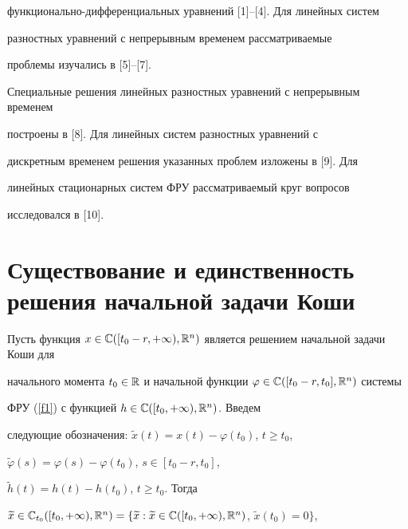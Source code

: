 функционально-дифференциальных уравнений [1]--[4]. Для линейных систем


разностных уравнений с непрерывным временем рассматриваемые


проблемы изучались в [5]--[7].


Специальные решения линейных разностных уравнений с непрерывным временем 


построены в [8]. Для линейных систем разностных уравнений с 


дискретным временем решения указанных проблем изложены в [9]. Для


линейных стационарных систем ФРУ рассматриваемый круг вопросов


исследовался в [10].








\section{Существование и единственность решения начальной задачи Коши}





Пусть функция $x\in\Bbb{C} ([t_{0}-r,+\infty)


,\Bbb{R}^{n}) $ является решением начальной задачи Коши для 


начального момента $t_{0}\in\Bbb{R}$ и начальной функции $\varphi\in


\Bbb{C} ([t_{0}-r,t_{0}],\Bbb{R}^{n}) $ системы 


ФРУ (\ref{f1}) с функцией $h\in


\Bbb{C} ([t_{0},+\infty),\Bbb{R}^{n})$. Введем 


следующие обозначения: $\widetilde{x} (t)


=x (t) -\varphi (t_{0}) $, $t\geq t_{0}$,


$\widetilde{\varphi } (s)=\varphi (s)


-\varphi (t_{0}) $, $s\in [t_{0}-r,t_{0}]$,


$\widetilde{h} (t)=h (t) -h (


t_{0}) $, $t\geq t_{0}$. Тогда


$\widetilde{x}\in\Bbb{C}_{t_{0}} ([


t_{0},+\infty),\Bbb{R}^{n})=\{


\widetilde{x}: \widetilde{x}\in \Bbb{C} ([


t_{0},+\infty),\Bbb{R}^{n})$, $\widetilde{x} (t_{0})=0 \}$,


